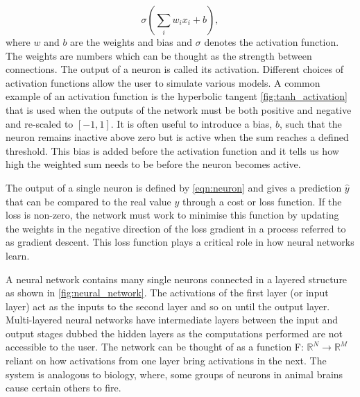 \documentclass[12pt]{iopart}
\begin{document}
\begin{equation}
\sigma(\sum_i w_i x_i + b),
\label{eqn:neuron}
\end{equation}
where $w$ and $b$ are the weights and bias and $\sigma$ denotes the activation function. The weights are numbers which can be thought as the strength between connections. The output of a neuron is called its activation. Different choices of activation functions allow the user to simulate various models. A common example of an activation function is the hyperbolic tangent \cref{fig:tanh_activation} that is used when the outputs of the network must be both positive and negative and re-scaled to $[-1,1]$. It is often useful to introduce a bias, $b$, such that the neuron remains inactive above zero but is active when the sum reaches a defined threshold. This bias is added before the activation function and it tells us how high the weighted sum needs to be before the neuron becomes active.

The output of a single neuron is defined by \cref{eqn:neuron} and gives a prediction $\hat{y}$ that can be compared to the real value $y$ through a cost or loss function. If the loss is non-zero, the network must work to minimise this function by updating the weights in the negative direction of the loss gradient in a process referred to as gradient descent. This loss function plays a critical role in how neural networks learn.

A neural network contains many single neurons connected in a layered structure as shown in \cref{fig:neural_network}. The activations of the first layer (or input layer) act as the inputs to the second layer and so on until the output layer. Multi-layered neural networks have intermediate layers between the input and output stages dubbed the hidden layers as the computations performed are not accessible to the user. The network can be thought of as a function F: $\mathbb{R}^N\rightarrow \mathbb{R}^M $ reliant on how activations from one layer bring activations in the next. The system is analogous to biology, where, some groups of neurons in animal brains cause certain others to fire. 
\end{document}

